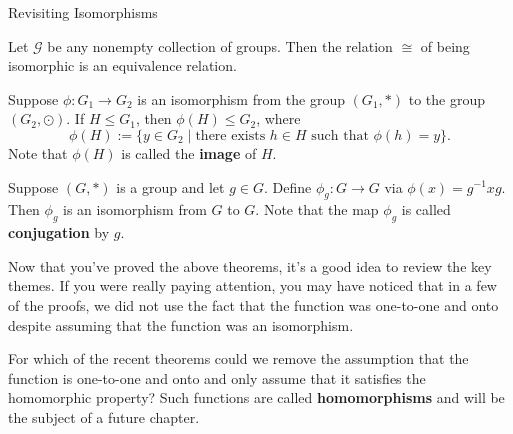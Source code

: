 \begin{section}{Revisiting Isomorphisms}
\begin{theorem}
Let $\mathcal{G}$ be any nonempty collection of groups.  Then the relation $\cong$ of being isomorphic is an equivalence relation.
\end{theorem}

\begin{theorem}
Suppose $\phi:G_1\to G_2$ is an isomorphism from the group $(G_1,*)$ to the group $(G_2,\odot)$.  If $H\leq G_1$, then $\phi(H)\leq G_2$, where
\[
\phi(H):=\{y\in G_2\mid \text{there exists } h\in H\text{ such that }\phi(h)=y\}. 
\]
Note that $\phi(H)$ is called the \textbf{image} of $H$.
\end{theorem}

\begin{theorem}
Suppose $(G,*)$ is a group and let $g\in G$.  Define $\phi_g:G\to G$ via $\phi(x)=g^{-1}xg$.  Then $\phi_g$ is an isomorphism from $G$ to $G$.  Note that the map $\phi_g$ is called \textbf{conjugation} by $g$.
\end{theorem}

Now that you've proved the above theorems, it's a good idea to review the key themes.  If you were really paying attention, you may have noticed that in a few of the proofs, we did not use the fact that the function was one-to-one and onto despite assuming that the function was an isomorphism.

\begin{problem}
For which of the recent theorems could we remove the assumption that the function is one-to-one and onto and only assume that it satisfies the homomorphic property?  Such functions are called \textbf{homomorphisms} and will be the subject of a future chapter.
\end{problem}


\end{section}